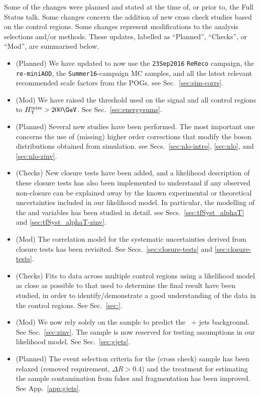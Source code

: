 Some of the changes were planned and stated at the time of, or prior
to, the Full Status talk. Some changes concern the addition of new
cross check studies based on the control regions. Some changes
represent modifications to the analysis selections and/or
methods. These updates, labelled as ``Planned'', ``Checks'', or
``Mod'', are summarised below.
  
\begin{itemize}
  
\item (Planned) We have updated to now use the \verb!23Sep2016!
  \verb!ReReco! campaign, the \verb!re-miniAOD!, the
  \verb!Summer16!-campaign MC samples, and all the latest relevant
  recommended scale factors from the POGs. \eg see
  Sec.~\ref{sec:sim-corrs}.
  
\item (Mod) We have raised the \HTmiss threshold used on the signal
  and all control regions to $\HTmiss > 200\GeV$. See
  Sec.~\ref{sec:energysums}. 
    
\item (Planned) Several new studies have been performed. The most
  important one concerns the use of (missing) higher order corrections
  that modify the boson \Pt distributions obtained from
  simulation. \eg see Secs.~\ref{sec:nlo-intro}, \ref{sec:nlo}, and
  \ref{sec:nlo-zinv}.

\item (Checks) New closure tests have been added, and a likelihood
  description of these closure tests has also been implemented to
  understand if any observed non-closure can be explained away by the
  known experimental or theoretical uncertainties included in our
  likelihood model. In particular, the modelling of the \alphat and
  \bdphi variables has been studied in detail. \eg see
  Secs.~\ref{sec:tfSyst_alphaT} and \ref{sec:tfSyst_alphaT-zinv}.

\item (Mod) The correlation model for the systematic uncertainties
  derived from closure tests has been revisited. See
  Secs.~\ref{sec:closure-tests} and \ref{sec:closure-tests}.

\item (Checks) Fits to data across multiple control regions using a
  likelihood model as close as possible to that used to determine the
  final result have been studied, in order to identify/demonstrate a
  good understanding of the data in the control regions. See
  Sec.~\ref{sec:}.

\item (Mod) We now rely solely on the \mmj sample to predict the
  \znunu\ + jets background. See Sec.~\ref{sec:zinv}. The \gj sample
  is now reserved for testing assumptions in our likelihood model. See
  Sec.~\ref{sec:gjets}.

\item (Planned) The event selection criteria for the \gj (cross check)
  sample has been relaxed (removed \alphat requirement, $\Delta R >
  0.4$) and the treatment for estimating the sample contamination from
  fakes and fragmentation has been improved. See App.~\ref{app:gjets}.

\end{itemize}

